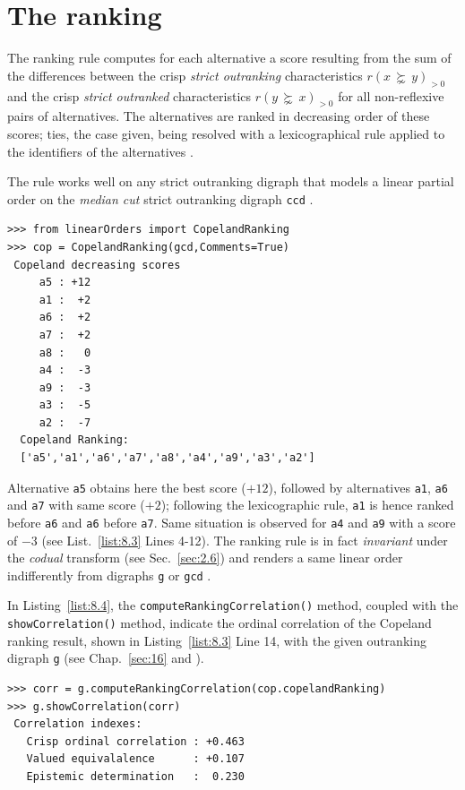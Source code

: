 \section{The \Copeland ranking}
\label{sec:8.2}

\begin{definition}\label{def:8.1}

\noindent The \Copeland ranking rule computes for each alternative a score resulting from the sum of the differences between the crisp \emph{strict outranking} characteristics $r(x\, \succnsim \,y)_{>0}$ and the crisp \emph{strict outranked} characteristics $r(y\, \succnsim \, x)_{>0}$  for all non-reflexive pairs of alternatives. The alternatives are ranked in decreasing order of these scores; ties, the case given, being resolved with a lexicographical rule applied to the identifiers of the alternatives \citep{COP-1951}.
\end{definition}

The \Copeland rule works well on any strict outranking digraph that models a linear partial order on the \emph{median cut} strict outranking digraph \texttt{ccd} \citep{DIA-2010}. 
\begin{lstlisting}[caption={Computing a \Copeland Ranking},label=list:8.3]
>>> from linearOrders import CopelandRanking
>>> cop = CopelandRanking(gcd,Comments=True)
 Copeland decreasing scores
     a5 : +12
     a1 :  +2
     a6 :  +2
     a7 :  +2
     a8 :   0
     a4 :  -3
     a9 :  -3
     a3 :  -5
     a2 :  -7
  Copeland Ranking:
  ['a5','a1','a6','a7','a8','a4','a9','a3','a2']
\end{lstlisting}

Alternative \texttt{a5} obtains here the best \Copeland score ($+12$), followed by alternatives \texttt{a1}, \texttt{a6} and \texttt{a7} with same score ($+2$); following the lexicographic rule, \texttt{a1} is hence ranked before \texttt{a6} and \texttt{a6} before \texttt{a7}. Same situation is observed for \texttt{a4} and \texttt{a9} with a score of $-3$ (see List.~\vref{list:8.3} Lines 4-12). The \Copeland ranking rule is in fact \emph{invariant} under the \emph{codual} transform (see Sec.~\ref{sec:2.6}) and renders a same linear order indifferently from digraphs \texttt{g} or \texttt{gcd} .

In Listing~\vref{list:8.4}, the \texttt{computeRankingCorrelation()} method, coupled with the \texttt{showCorrelation()} method, indicate the ordinal correlation of the {\sc Cope\-land} ranking result, shown in Listing~\vref{list:8.3} Line 14, with the given outranking digraph \texttt{g} (see Chap.~\ref{sec:16} and \citealp{BIS-2012a}).
\begin{lstlisting}[caption={Checking the ordinal quality of the \Copeland ranking},label=list:8.4]
>>> corr = g.computeRankingCorrelation(cop.copelandRanking)
>>> g.showCorrelation(corr)
 Correlation indexes:
   Crisp ordinal correlation : +0.463
   Valued equivalalence      : +0.107
   Epistemic determination   :  0.230
\end{lstlisting}

